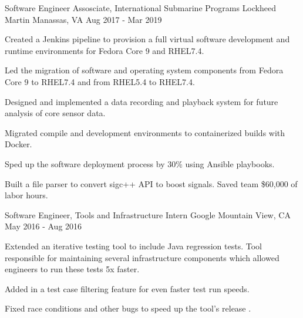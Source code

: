 \begin{cventries}
  \cventry
    {Software Engineer Assosciate, International Submarine Programs} %
    {Lockheed Martin} %
    {Manassas, VA} %
    {Aug 2017 - Mar 2019} %
    {
      \begin{cvitems} %
        \item {Created a Jenkins pipeline to provision a full virtual software development and runtime environments for Fedora Core 9 and RHEL7.4.}
        \item {Led the migration of software and operating system components from Fedora Core 9 to RHEL7.4 and from RHEL5.4 to RHEL7.4.}
        \item {Designed and implemented a data recording and playback system for future analysis of core sensor data.}
        \item {Migrated compile and development environments to containerized builds with Docker.}
        \item {Sped up the software deployment process by 30\% using Ansible playbooks.}
        \item {Built a file parser to convert sigc++ API to boost signals. Saved team \$60,000 of labor hours.}
      \end{cvitems}
    }

  \cventry
    {Software Engineer, Tools and Infrastructure Intern} %
    {Google} %
    {Mountain View, CA} %
    {May 2016 - Aug 2016} %
    {
      \begin{cvitems} %
        \item {Extended an iterative testing tool to include Java regression tests. Tool responsible for maintaining several infrastructure components which allowed engineers to run these tests 5x faster.}
        \item {Added in a test case filtering feature for even faster test run speeds.}
        \item {Fixed race conditions and other bugs to speed up the tool's release .}
      \end{cvitems}
    }


\end{cventries}
